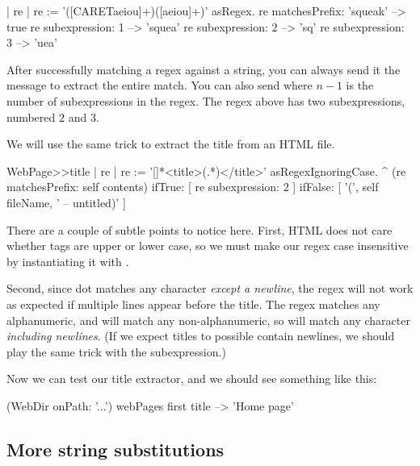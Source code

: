 \documentclass[a4paper,10pt,twoside]{book}
\begin{document}
\begin{code}{| re |}
re := '([CARETaeiou]+)([aeiou]+)' asRegex.
re matchesPrefix: 'squeak' --> true
re subexpression: 1            --> 'squea'
re subexpression: 2            --> 'sq'
re subexpression: 3            --> 'uea'
\end{code}

After successfully matching a regex against a string, you can always send it the message  to extract the entire match.  You can also send  where $n-1$ is the number of subexpressions in the regex. The regex above has two subexpressions, numbered $2$ and $3$.

We will use the same trick to extract the title from an HTML file.


\begin{code}{}
WebPage>>title
	| re |
	re := '[\w\W]*<title>(.*)</title>' asRegexIgnoringCase.
	^ (re matchesPrefix: self contents)
		ifTrue: [ re subexpression: 2 ]
		ifFalse: [ '(', self fileName, ' -- untitled)' ]
\end{code}

There are a couple of subtle points to notice here.
First, HTML does not care whether tags are upper or lower case, so we must make our regex case insensitive by instantiating it with .

Second, since dot matches any character \emph{except a newline}, the regex \mbox{} will not work as expected if multiple lines appear before the title.
The regex \ct{\w} matches any alphanumeric, and \ct{\W} will match any non-alphanumeric, so \ct{[\w\W]} will match any character \emph{including newlines}.
(If we expect titles to possible contain newlines, we should play the same trick with the subexpression.)

Now we can test our title extractor, and we should see something like this:

\begin{code}{}
(WebDir onPath: '...') webPages first title --> 'Home page'
\end{code}

\subsection{More string substitutions}
\end{document}
